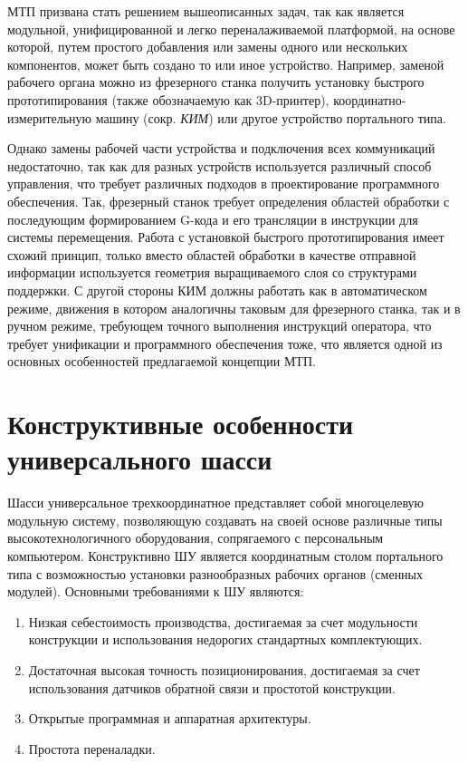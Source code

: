 МТП призвана стать решением вышеописанных задач, так как является модульной, унифицированной и легко переналаживаемой платформой, на основе которой, путем простого добавления или замены одного или нескольких компонентов, может быть создано то или иное устройство. Например, заменой рабочего органа можно из фрезерного станка получить установку быстрого прототипирования (также обозначаемую как 3D-принтер), координатно-измерительную машину (сокр. \textit{КИМ}) или другое устройство портального типа.

Однако замены рабочей части устройства и подключения всех коммуникаций недостаточно, так как для разных устройств используется различный способ управления, что требует различных подходов в проектирование программного обеспечения. Так, фрезерный станок требует определения областей обработки с последующим формированием G-кода и его трансляции в инструкции для системы перемещения. Работа с установкой быстрого прототипирования имеет схожий принцип, только вместо областей обработки в качестве отправной информации используется геометрия выращиваемого слоя со структурами поддержки. С другой стороны КИМ должны работать как в автоматическом режиме, движения в котором аналогичны таковым для фрезерного станка, так и в ручном режиме, требующем точного выполнения инструкций оператора, что требует унификации и программного обеспечения тоже, что является одной из основных особенностей предлагаемой концепции МТП.

\section{Конструктивные особенности универсального шасси}

Шасси универсальное трехкоординатное представляет собой многоцелевую модульную систему, позволяющую создавать на своей основе различные типы высокотехнологичного оборудования, сопрягаемого с персональным компьютером. Конструктивно ШУ является координатным столом портального типа с возможностью установки разнообразных рабочих органов (сменных модулей). Основными требованиями к ШУ являются:

\begin{enumerate}
	\item Низкая себестоимость производства, достигаемая за счет модульности конструкции и использования недорогих стандартных комплектующих.
	
	\item Достаточная высокая точность позиционирования, достигаемая за счет использования датчиков обратной связи и простотой конструкции.
	
	\item Открытые программная и аппаратная архитектуры.
	
	\item Простота переналадки.
\end{enumerate}

